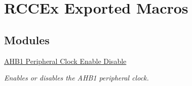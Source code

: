\hypertarget{group___r_c_c_ex___exported___macros}{}\section{R\+C\+C\+Ex Exported Macros}
\label{group___r_c_c_ex___exported___macros}
\subsection*{Modules}
\begin{DoxyCompactItemize}
\item 
\hyperlink{group___r_c_c_ex___a_h_b1___clock___enable___disable}{A\+H\+B1 Peripheral Clock Enable Disable}
\begin{DoxyCompactList}\small\item\em Enables or disables the A\+H\+B1 peripheral clock. \end{DoxyCompactList}\end{DoxyCompactItemize}
